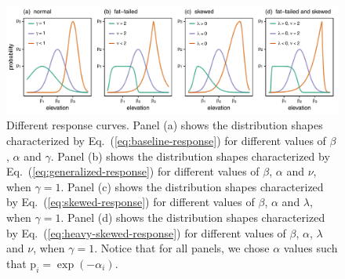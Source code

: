 \documentclass[11pt, a4paper]{article}
\begin{document}
\begin{figure}[h]
  \centering
    \includegraphics[width=1\textwidth]{figures/all-distributions}
	   \caption{Different response curves. Panel (a) shows the distribution shapes characterized by Eq.~(\ref{eq:baseline-response}) for different values of $\beta$, $\alpha$ and $\gamma$. Panel (b) shows the distribution shapes characterized by Eq.~(\ref{eq:generalized-response}) for different values of $\beta$, $\alpha$ and $\nu$, when $\gamma=1$. Panel (c) shows the distribution shapes characterized by Eq.~(\ref{eq:skewed-response}) for different values of $\beta$, $\alpha$ and $\lambda$, when $\gamma=1$. Panel (d) shows the distribution shapes characterized by Eq.~(\ref{eq:heavy-skewed-response}) for different values of $\beta$, $\alpha$, $\lambda$ and $\nu$, when $\gamma=1$. Notice that for all panels, we chose $\alpha$ values such that $\text{p}_i = \exp(-\alpha_i)$.
	   }
      \label{fig:response}
\end{figure}
\end{document}
